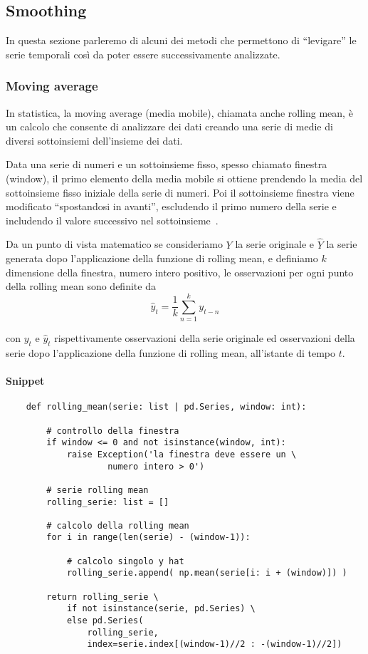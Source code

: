 \subsection{Smoothing}
In questa sezione parleremo di alcuni dei metodi che permettono di ``levigare''
le serie temporali così da poter essere successivamente analizzate.   


\subsubsection{Moving average}
In statistica, la moving average (media mobile), chiamata anche rolling mean,
è un calcolo che consente di analizzare dei dati creando una serie di 
medie di diversi sottoinsiemi dell'insieme dei dati.

Data una serie di numeri e un sottoinsieme fisso, spesso chiamato finestra (window), 
il primo elemento della media mobile si ottiene prendendo la media del sottoinsieme 
fisso iniziale della serie di numeri. 
Poi il sottoinsieme finestra viene modificato ``spostandosi in avanti'', escludendo 
il primo numero della serie e includendo il valore successivo nel sottoinsieme~\cite{wiki:roll_mean}.

Da un punto di vista matematico se consideriamo $Y$ la serie originale e $\hat{Y}$ la serie
generata dopo l'applicazione della funzione di rolling mean, e definiamo $k$ dimensione 
della finestra, numero intero positivo, le
osservazioni per ogni punto della rolling mean sono definite da
\[ \hat{y}_t = \frac{1}{k}\sum_{n = 1}^{k} y_{t-n}  \]

con $y_t$ e $\hat{y}_t$  rispettivamente osservazioni della serie originale ed osservazioni
della serie dopo l'applicazione della funzione di rolling mean, all'istante di tempo $t$.

\paragraph*{Snippet}
\begin{verbatim}
    def rolling_mean(serie: list | pd.Series, window: int):

        # controllo della finestra
        if window <= 0 and not isinstance(window, int):
            raise Exception('la finestra deve essere un \
                    numero intero > 0')

        # serie rolling mean
        rolling_serie: list = []

        # calcolo della rolling mean
        for i in range(len(serie) - (window-1)):

            # calcolo singolo y hat
            rolling_serie.append( np.mean(serie[i: i + (window)]) )

        return rolling_serie \
            if not isinstance(serie, pd.Series) \
            else pd.Series(
                rolling_serie, 
                index=serie.index[(window-1)//2 : -(window-1)//2])
\end{verbatim}

